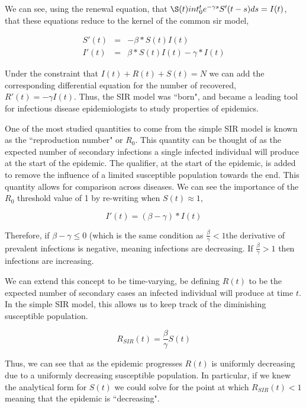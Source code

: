 \documentclass{umassthesis}          %
\begin{document}
We can see, using the renewal equation, that $\S(t)int_0^t e^{-\gamma s}S'(t-s)ds = I(t)$, that these equations reduce to the kernel of the common sir model,


\begin{eqnarray}
S'(t) &=& -\beta*S(t)I(t)\\
I'(t) &=& \beta*S(t)I(t) - \gamma*I(t)
\end{eqnarray}

Under the constraint that $I(t) + R(t) +S(t) = N$ we can add the corresponding differential equation for the number of recovered, $R'(t) = -\gamma I(t)$. Thus, the SIR model was ``born", and became a leading tool for infectious disease epidemiologists to study properties of epidemics.

One of the most studied quantities to come from the simple SIR model is known as the ``reproduction number" or $R_0$. This quantity can be thought of as the expected number of secondary infections a single infected individual will produce at the start of the epidemic. The qualifier, at the start of the epidemic, is added to remove the influence of a limited susceptible population towards the end. This quantity allows for comparison across diseases. We can see the importance of the $R_0$ threshold value of 1 by re-writing when $S(t) \approx 1$, 

\begin{equation}
I'(t) =(\beta - \gamma) *I(t)
\end{equation}

Therefore, if $\beta-\gamma \leq 0$ (which is the same condition as $\frac{\beta}{\gamma}  < 1$the derivative of prevalent infections is negative, meaning infections are decreasing. If $\frac{\beta}{\gamma}  >1$ then infections are increasing. 

We can extend this concept to be time-varying, be defining $R(t)$ to be the expected number of secondary cases an infected individual will produce at time $t$. In the simple SIR model, this allows us to keep track of the diminishing susceptible population. 

\begin{equation}
R_{SIR}(t) = \frac{\beta}{\gamma}S(t)
\end{equation}

Thus, we can see that as the epidemic progresses $R(t)$ is uniformly decreasing due to a uniformly decreasing susceptible population. In particular, if we knew the analytical form for $S(t)$ we could solve for the point at which $R_{SIR}(t) <1$ meaning that the epidemic is ``decreasing".
\end{document}
